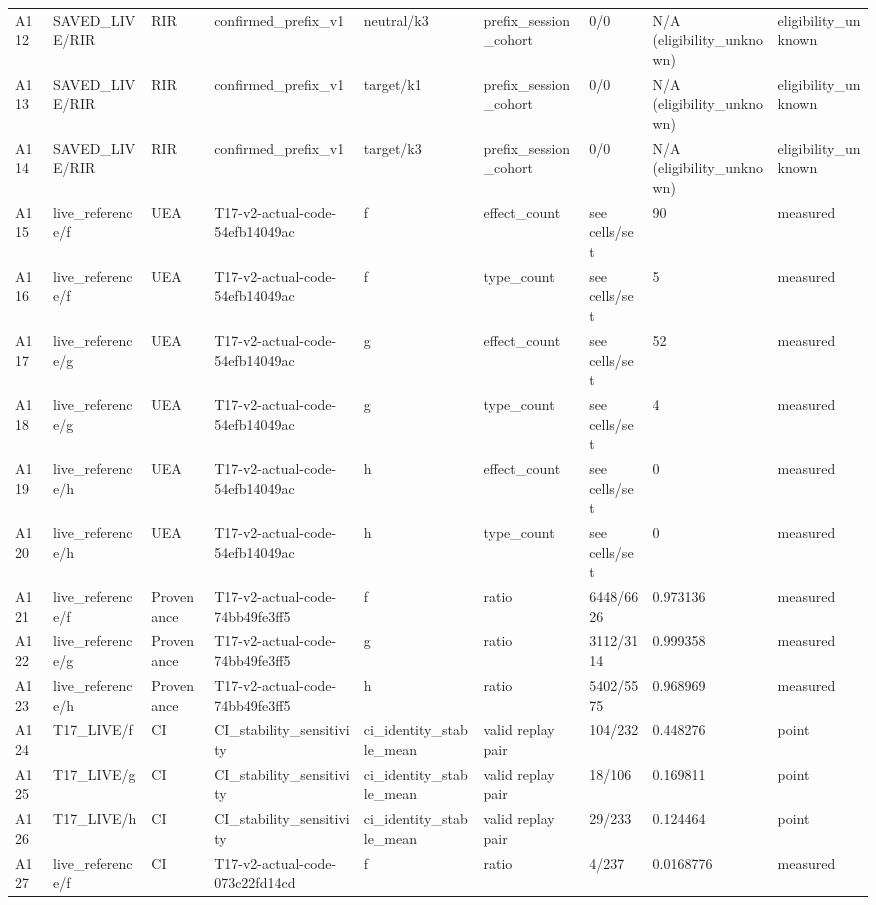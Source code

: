 \begin{longtable}{lllllllll}
A112 & SAVED\_LIVE/RIR & RIR & confirmed\_prefix\_v1 & neutral/k3 & prefix\_session\_cohort & 0/0 & N/A (eligibility\_unknown) & eligibility\_unknown \\
A113 & SAVED\_LIVE/RIR & RIR & confirmed\_prefix\_v1 & target/k1 & prefix\_session\_cohort & 0/0 & N/A (eligibility\_unknown) & eligibility\_unknown \\
A114 & SAVED\_LIVE/RIR & RIR & confirmed\_prefix\_v1 & target/k3 & prefix\_session\_cohort & 0/0 & N/A (eligibility\_unknown) & eligibility\_unknown \\
A115 & live\_reference/f & UEA & T17-v2-actual-code-54efb14049ac & f & effect\_count & see cells/set & 90 & measured \\
A116 & live\_reference/f & UEA & T17-v2-actual-code-54efb14049ac & f & type\_count & see cells/set & 5 & measured \\
A117 & live\_reference/g & UEA & T17-v2-actual-code-54efb14049ac & g & effect\_count & see cells/set & 52 & measured \\
A118 & live\_reference/g & UEA & T17-v2-actual-code-54efb14049ac & g & type\_count & see cells/set & 4 & measured \\
A119 & live\_reference/h & UEA & T17-v2-actual-code-54efb14049ac & h & effect\_count & see cells/set & 0 & measured \\
A120 & live\_reference/h & UEA & T17-v2-actual-code-54efb14049ac & h & type\_count & see cells/set & 0 & measured \\
A121 & live\_reference/f & Provenance & T17-v2-actual-code-74bb49fe3ff5 & f & ratio & 6448/6626 & 0.973136 & measured \\
A122 & live\_reference/g & Provenance & T17-v2-actual-code-74bb49fe3ff5 & g & ratio & 3112/3114 & 0.999358 & measured \\
A123 & live\_reference/h & Provenance & T17-v2-actual-code-74bb49fe3ff5 & h & ratio & 5402/5575 & 0.968969 & measured \\
A124 & T17\_LIVE/f & CI & CI\_stability\_sensitivity & ci\_identity\_stable\_mean & valid replay pair & 104/232 & 0.448276 & point \\
A125 & T17\_LIVE/g & CI & CI\_stability\_sensitivity & ci\_identity\_stable\_mean & valid replay pair & 18/106 & 0.169811 & point \\
A126 & T17\_LIVE/h & CI & CI\_stability\_sensitivity & ci\_identity\_stable\_mean & valid replay pair & 29/233 & 0.124464 & point \\
A127 & live\_reference/f & CI & T17-v2-actual-code-073c22fd14cd & f & ratio & 4/237 & 0.0168776 & measured \\

\end{longtable}
